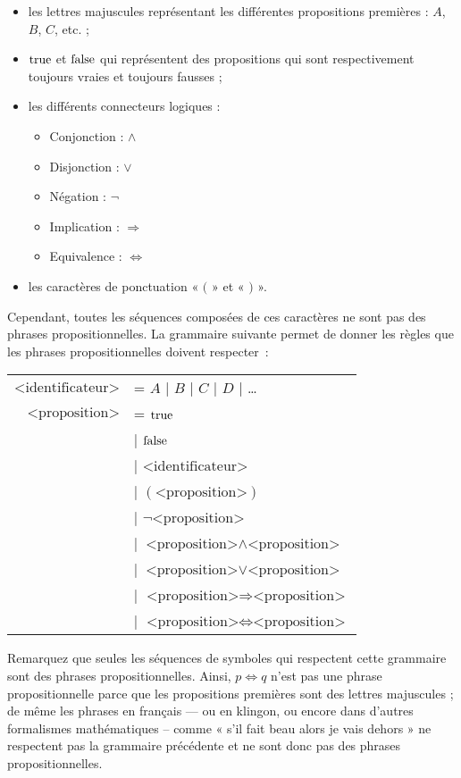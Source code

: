 \begin{itemize}
\item les lettres majuscules représentant les différentes propositions
  premières : $A$, $B$, $C$, etc. ;
\item $\mathrm{true}$ et $\mathrm{false}$ qui représentent des propositions qui sont
  respectivement toujours vraies et toujours fausses ;
\item les différents connecteurs logiques :
	\begin{itemize}
	\item Conjonction : $\land$
	\item Disjonction : $\lor$
	\item Négation :  $\lnot$
	\item Implication :  $\Rightarrow$
	\item Equivalence :  $\Leftrightarrow$
	\end{itemize}
\item les caractères de ponctuation « $($ » et « $)$ ».
\end{itemize}

Cependant, toutes les séquences composées de ces caractères ne sont pas des
phrases propositionnelles. La grammaire suivante permet de donner les règles que
les phrases propositionnelles doivent respecter~:

\begin{tabular}{rl}
  $\textrm{<identificateur>}$ & = $A$ | $B$ | $C$ | $D$ | \dots \\
  $\textrm{<proposition>}$
  & = $\mathrm{true}$ \\
  & | $\mathrm{false}$ \\
  & | $\textrm{<identificateur>}$ \\
  & | $(\textrm{<proposition>})$ \\
  & | $\lnot \textrm{<proposition>}$ \\
  & | $\textrm{<proposition>} \land \textrm{<proposition>}$ \\
  & | $\textrm{<proposition>} \lor \textrm{<proposition>}$ \\
  & | $\textrm{<proposition>} \Rightarrow \textrm{<proposition>}$ \\
  & | $\textrm{<proposition>} \Leftrightarrow \textrm{<proposition>}$
\end{tabular}
\vspace{2 mm}

Remarquez que seules les séquences de symboles qui respectent cette
grammaire sont des phrases propositionnelles. Ainsi, $p \Leftrightarrow q$
n’est pas une phrase propositionnelle parce que les propositions
premières sont des lettres majuscules ; de même les phrases en français —
ou en klingon, ou encore dans d’autres formalismes mathématiques – comme «
  s’il fait beau alors je vais dehors » ne respectent pas la grammaire
précédente et ne sont donc pas des phrases propositionnelles.

